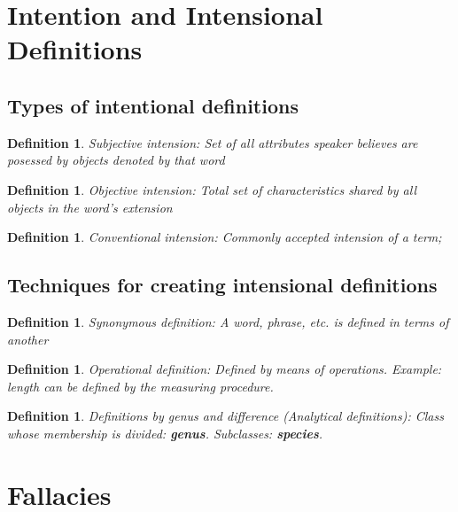 \documentclass[5pt]{book}
\newtheorem{definition}[theorem]{Definition}
\begin{document}
\section{Intention and Intensional Definitions}
\subsection{Types of intentional definitions}
\begin{definition}Subjective intension: Set of all attributes speaker
    believes are posessed by objects denoted by that word
\end{definition}

\begin{definition}Objective intension: Total set of characteristics
    shared by all objects in the word's extension
\end{definition}

\begin{definition}
    Conventional intension: Commonly accepted intension of a term; 
\end{definition}

\subsection{Techniques for creating intensional definitions}
\begin{definition}Synonymous definition: A word, phrase, etc. is defined
    in terms of another
\end{definition}

\begin{definition}Operational definition: Defined by means of operations.
    Example: length can be defined by the measuring procedure.
\end{definition}

\begin{definition}Definitions by genus and difference (Analytical definitions):
    Class whose membership is divided: \textbf{genus}. Subclasses: \textbf{species}.
\end{definition}

\section{Fallacies}
\end{document}
